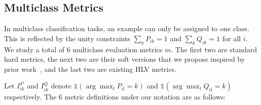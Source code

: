 \documentclass[shortpaper]{clv2025}
\begin{document}
\subsection{Multiclass Metrics}\label{sec:metrics}

In multiclass classification tasks, an example can only be assigned to one
class. This is reflected by the unity constraints $\sum_{k}P_{ik}=1$ and
$\sum_{k}Q_{ik}=1$ for all $i$.  We study a total of 6 multiclass evaluation
metrics $m$. The first two are standard hard metrics, the next two are their
soft versions that we propose inspired by prior
work~\citep{binaghi1999,harju2023}, and the last two are existing HLV metrics.

Let $I^P_{ik}$ and $I^Q_{ik}$ denote $\mathds{1}(\arg\max_{l}P_{il}=k)$ and
$\mathds{1}(\arg\max_{l}Q_{il}=k)$ respectively. The 6 metric definitions under our
notation are as follows:
\end{document}
